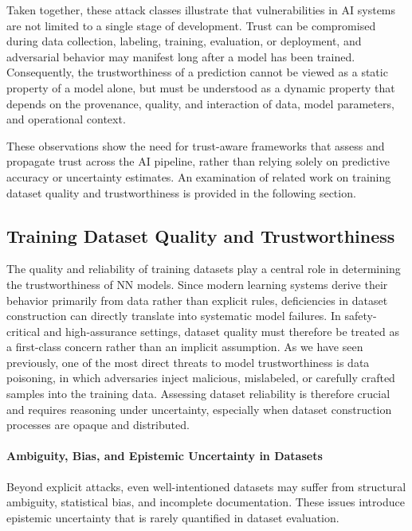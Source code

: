 Taken together, these attack classes illustrate that vulnerabilities in \ac{AI} systems are not limited to a single stage of development. Trust can be compromised during data collection, labeling, training, evaluation, or deployment, and adversarial behavior may manifest long after a model has been trained. Consequently, the trustworthiness of a prediction cannot be viewed as a static property of a model alone, but must be understood as a dynamic property that depends on the provenance, quality, and interaction of data, model parameters, and operational context.

These observations show the need for trust-aware frameworks that assess and propagate trust across the \ac{AI} pipeline, rather than relying solely on predictive accuracy or uncertainty estimates. An examination of related work on training dataset quality and trustworthiness is provided in the following section.

\subsection{Training Dataset Quality and Trustworthiness}
\label{subsec:dataset_quality}

The quality and reliability of training datasets play a central role in determining the trustworthiness of \ac{NN} models. Since modern learning systems derive their behavior primarily from data rather than explicit rules, deficiencies in dataset construction can directly translate into systematic model failures. In safety-critical and high-assurance settings, dataset quality must therefore be treated as a first-class concern rather than an implicit assumption. As we have seen previously, one of the most direct threats to model trustworthiness is data poisoning, in which adversaries inject malicious, mislabeled, or carefully crafted samples into the training data. Assessing dataset reliability is therefore crucial and requires reasoning under uncertainty, especially when dataset construction processes are opaque and distributed. 

\paragraph{Ambiguity, Bias, and Epistemic Uncertainty in Datasets}
Beyond explicit attacks, even well-intentioned datasets may suffer from structural ambiguity, statistical bias, and incomplete documentation. These issues introduce epistemic uncertainty that is rarely quantified in dataset evaluation.

